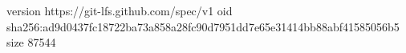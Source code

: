 version https://git-lfs.github.com/spec/v1
oid sha256:ad9d0437fc18722ba73a858a28fc90d7951dd7e65e31414bb88abf41585056b5
size 87544
